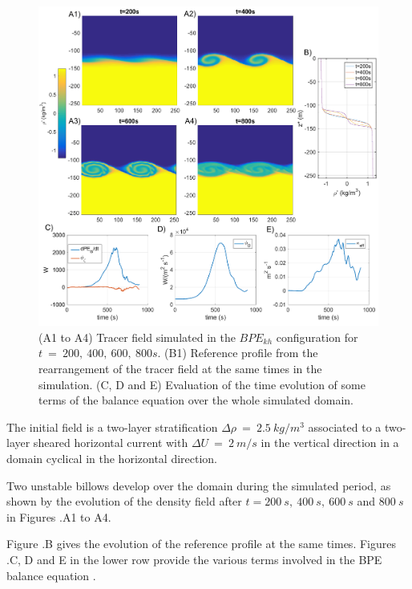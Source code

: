 \begin{figure}[h!]
\centering
\includegraphics[width=1\textwidth]{./CHAP_BPE/Fig_KH2.png}
\caption[Tracer field and evaluation of $\kappa_{eff}$ for configuration $BPE_{kh}$]{(A1 to A4) Tracer field simulated in the $BPE_{kh}$ configuration for $t\ = \ 200,\ 400,\ 600,\ 800s$. (B1) Reference profile from the rearrangement of the tracer field at the same times in the simulation. (C, D and E) Evaluation of the time evolution of some terms of the balance equation  over the whole simulated domain.}
\label{figCkh}
\end{figure}
The initial field is a two-layer stratification  $\Delta \rho\  =\ 2.5\ kg/m^3$ associated to a two-layer sheared horizontal current with $\Delta U\ =\ 2\ m/s$ in the vertical direction in a domain cyclical in the horizontal direction. 

Two unstable billows develop over the domain during the simulated period, as shown by the evolution of the density field after $t = 200\ s,\ 400\ s,\ 600\ s$ and $800\ s$ in Figures .A1 to A4.

Figure .B gives the evolution of the reference profile at the same times. Figures .C, D and E in the lower row provide the various terms involved in the BPE balance equation .

